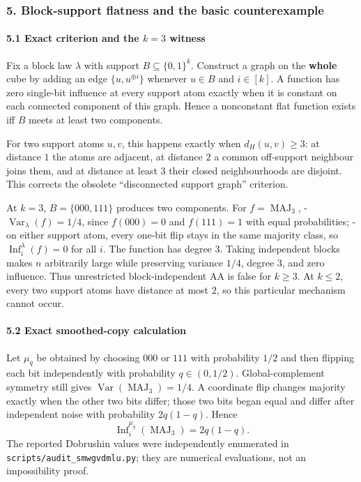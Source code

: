 \subsubsection{5. Block-support flatness and the basic counterexample}\label{block-support-flatness-and-the-basic-counterexample}

\paragraph{\texorpdfstring{5.1 Exact criterion and the \(k=3\) witness}{5.1 Exact criterion and the k=3 witness}}\label{exact-criterion-and-the-k3-witness}

Fix a block law \(\lambda\) with support \(B\subseteq\{0,1\}^k\). Construct a graph on the \textbf{whole} cube by adding an edge \(\{u,u^{\oplus i}\}\) whenever \(u\in B\) and \(i\in[k]\). A function has zero single-bit influence at every support atom exactly when it is constant on each connected component of this graph. Hence a nonconstant flat function exists iff \(B\) meets at least two components.

For two support atoms \(u,v\), this happens exactly when \(d_H(u,v)\ge3\): at distance \(1\) the atoms are adjacent, at distance \(2\) a common off-support neighbour joins them, and at distance at least \(3\) their closed neighbourhoods are disjoint. This corrects the obsolete ``disconnected support graph'' criterion.

At \(k=3\), \(B=\{000,111\}\) produces two components. For \(f=\operatorname{MAJ}_3\),
- \(\operatorname{Var}_\lambda(f)=1/4\), since \(f(000)=0\) and \(f(111)=1\) with equal probabilities;
- on either support atom, every one-bit flip stays in the same majority class, so \(\operatorname{Inf}_i^\lambda(f)=0\) for all \(i\).
The function has degree \(3\). Taking independent blocks makes \(n\) arbitrarily large while preserving variance \(1/4\), degree \(3\), and zero influence. Thus unrestricted block-independent AA is false for \(k\ge3\). At \(k\le2\), every two support atoms have distance at most \(2\), so this particular mechanism cannot occur.

\paragraph{5.2 Exact smoothed-copy calculation}\label{exact-smoothed-copy-calculation}

Let \(\mu_q\) be obtained by choosing \(000\) or \(111\) with probability \(1/2\) and then flipping each bit independently with probability \(q\in(0,1/2)\). Global-complement symmetry still gives \(\operatorname{Var}(\operatorname{MAJ}_3)=1/4\). A coordinate flip changes majority exactly when the other two bits differ; those two bits began equal and differ after independent noise with probability \(2q(1-q)\). Hence
\[\operatorname{Inf}_i^{\mu_q}(\operatorname{MAJ}_3)=2q(1-q).\]
The reported Dobrushin values were independently enumerated in \texttt{scripts/audit\_smwgvdmlu.py}; they are numerical evaluations, not an impossibility proof.

